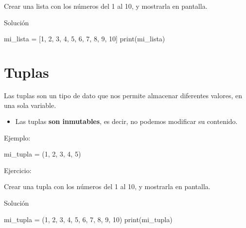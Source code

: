 \documentclass[
  a4paper,
  DIV=11,
  numbers=noendperiod,
  onepage,
  openany]{scrreprt}
\newenvironment{Shaded}{\begin{snugshade}}{\end{snugshade}}
\newcommand{\BuiltInTok}[1]{\textcolor[rgb]{0.00,0.23,0.31}{#1}}
\newcommand{\DecValTok}[1]{\textcolor[rgb]{0.68,0.00,0.00}{#1}}
\newcommand{\NormalTok}[1]{\textcolor[rgb]{0.00,0.23,0.31}{#1}}
\newcommand{\OperatorTok}[1]{\textcolor[rgb]{0.37,0.37,0.37}{#1}}
\providecommand{\tightlist}{%
  \setlength{\itemsep}{0pt}\setlength{\parskip}{0pt}}\usepackage{longtable,booktabs,array}
\begin{document}
Crear una lista con los números del 1 al 10, y mostrarla en pantalla.

Solución

\begin{Shaded}
\begin{Highlighting}[]
\NormalTok{  mi\_lista }\OperatorTok{=}\NormalTok{ [}\DecValTok{1}\NormalTok{, }\DecValTok{2}\NormalTok{, }\DecValTok{3}\NormalTok{, }\DecValTok{4}\NormalTok{, }\DecValTok{5}\NormalTok{, }\DecValTok{6}\NormalTok{, }\DecValTok{7}\NormalTok{, }\DecValTok{8}\NormalTok{, }\DecValTok{9}\NormalTok{, }\DecValTok{10}\NormalTok{]}
  \BuiltInTok{print}\NormalTok{(mi\_lista)}
\end{Highlighting}
\end{Shaded}

\chapter{Tuplas}\label{tuplas}

Las tuplas son un tipo de dato que nos permite almacenar diferentes
valores, en una sola variable.

\begin{itemize}
\tightlist
\item
  Las tuplas \textbf{son inmutables}, es decir, no podemos modificar su
  contenido.
\end{itemize}

Ejemplo:

\begin{Shaded}
\begin{Highlighting}[]
\NormalTok{mi\_tupla }\OperatorTok{=}\NormalTok{ (}\DecValTok{1}\NormalTok{, }\DecValTok{2}\NormalTok{, }\DecValTok{3}\NormalTok{, }\DecValTok{4}\NormalTok{, }\DecValTok{5}\NormalTok{)}
\end{Highlighting}
\end{Shaded}

Ejercicio:

Crear una tupla con los números del 1 al 10, y mostrarla en pantalla.

Solución

\begin{Shaded}
\begin{Highlighting}[]
\NormalTok{  mi\_tupla }\OperatorTok{=}\NormalTok{ (}\DecValTok{1}\NormalTok{, }\DecValTok{2}\NormalTok{, }\DecValTok{3}\NormalTok{, }\DecValTok{4}\NormalTok{, }\DecValTok{5}\NormalTok{, }\DecValTok{6}\NormalTok{, }\DecValTok{7}\NormalTok{, }\DecValTok{8}\NormalTok{, }\DecValTok{9}\NormalTok{, }\DecValTok{10}\NormalTok{)}
  \BuiltInTok{print}\NormalTok{(mi\_tupla)}
\end{Highlighting}
\end{Shaded}
\end{document}
